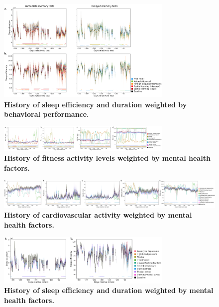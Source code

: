 \documentclass[10pt]{article}
\begin{document}
\begin{figure}[p]
  \centering
  \includegraphics[width=0.75\textwidth]{figs/weighted_timecourse_sleep}
\caption{\textbf{History of sleep efficiency and duration weighted by
    behavioral performance.}}
\label{fig:sleep_timecourse}
\end{figure}

\begin{figure}
  \centering
  \includegraphics[width=0.75\textwidth]{figs/weighted_timecourse_activity_MH}
\caption{\textbf{History of fitness activity levels weighted by
    mental health factors.}}
\label{fig:activity_timecourse_MH}
\end{figure}

\begin{figure}
  \centering
  \includegraphics[width=\textwidth]{figs/weighted_timecourse_HR_MH}
\caption{\textbf{History of cardiovascular activity weighted by
    mental health factors.}}
\label{fig:HR_timecourse_MH}
  \end{figure}

\begin{figure}[p]
  \centering
  \includegraphics[width=0.75\textwidth]{figs/weighted_timecourse_sleep_MH}
\caption{\textbf{History of sleep efficiency and duration weighted by
    mental health factors.}}
\label{fig:sleep_timecourse_MH}
  \end{figure}

  \clearpage
  \newpage


\end{document}
